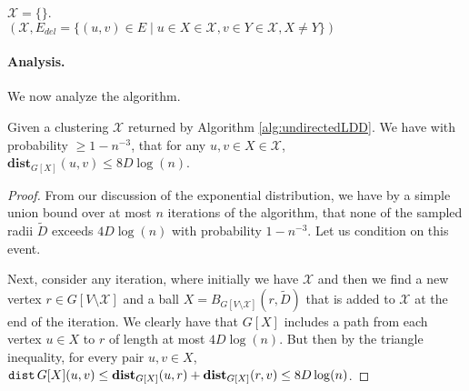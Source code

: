 \begin{algorithm}
$\mathcal{X} = \{\}$.\\
\Return $(\mathcal{X}, E_{del} = \{ (u,v) \in E \;|\; u \in X \in \mathcal{X}, v \in Y \in \mathcal{X}, X \neq Y\})$
\caption{$\textsc{ComputeLDD}(G, D)$}
\label{alg:undirectedLDD}
\end{algorithm}

\paragraph{Analysis.} We now analyze the algorithm.

\begin{claim}
Given a clustering $\mathcal{X}$ returned by Algorithm \ref{alg:undirectedLDD}. We have with probability $\geq 1 - n^{-3}$, that for any $u,v \in X \in \mathcal{X}$, $\mathbf{dist}_{G[X]}(u,v) \leq 8 D \log(n)$. 
\end{claim}
\begin{proof}
From our discussion of the exponential distribution, we have by a simple union bound over at most $n$ iterations of the algorithm, that none of the sampled radii $\tilde{D}$ exceeds $4 D \log(n)$ with probability $1 - n^{-3}$. Let us condition on this event. 

Next, consider any iteration, where initially we have $\mathcal{X}$ and then we find a new vertex $r \in G[V \setminus \mathcal{X}]$ and a ball $X = B_{G[V \setminus \mathcal{X}]}(r, \tilde{D})$ that is added to $\mathcal{X}$ at the end of the iteration. We clearly have that $G[X]$ includes a path from each vertex $u \in X$ to $r$ of length at most $4 D \log(n)$. But then by the triangle inequality, for every pair $u,v \in X$, $\operatorname{\mathtt{dist}}{G[X]}(u,v) \leq \mathbf{dist}_{G[X]}(u,r) + \mathbf{dist}_{G[X]}(r,v) \leq 8 D \log(n)$.
\end{proof}

